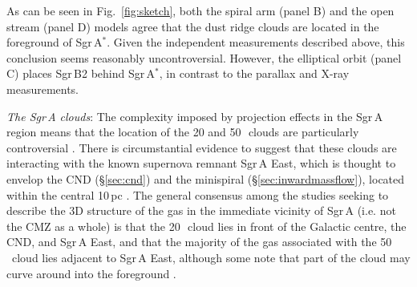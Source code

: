 As can be seen in Fig.~\ref{fig:sketch}, both the spiral arm (panel B) and the open stream (panel D) models agree that the dust ridge clouds are located in the foreground of Sgr\,A$^{*}$. 
Given the independent measurements described above, this conclusion seems reasonably uncontroversial. 
However, the elliptical orbit (panel C) places Sgr\,B2 behind Sgr\,A$^{*}$, in contrast to the parallax and X-ray measurements.
\medskip 

\noindent\emph{The Sgr\,A clouds}: The complexity imposed by projection effects in the Sgr\,A region means that the location of the 20 and 50\,\kms \ clouds are particularly controversial \citep[see ][for a comprehensive summary]{Ferriere2012}. 
There is circumstantial evidence to suggest that these clouds are interacting with the known supernova remnant Sgr\,A East, which is thought to envelop the CND (\S\ref{sec:cnd}) and the minispiral (\S\ref{sec:inwardmassflow}), located within the central 10\,pc \citep{Zylka1990,Ho1991,Serabyn1992,Coil1999, Coil2000, Yusef-Zadeh1999a, Sjouwerman2008, Hsieh2017, Hsieh2019, Tsuboi2018, Tanaka2021}. 
The general consensus among the studies seeking to describe the 3D structure of the gas in the immediate vicinity of Sgr\,A (i.e. not the CMZ as a whole) is that the 20\,\kms \ cloud lies in front of the Galactic centre, the CND, and Sgr\,A East, and that the majority of the gas associated with the 50\,\kms \ cloud lies adjacent to Sgr\,A East, although some note that part of the cloud may curve around into the foreground \citep{Herrnstein2005, Lee2008}.

